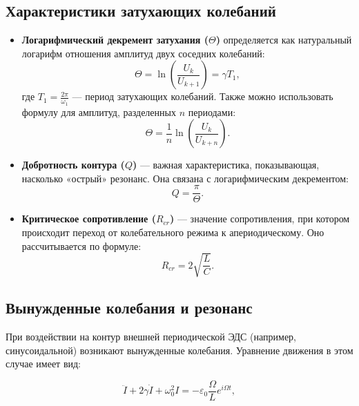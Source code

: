 \documentclass[a4paper]{article}
\begin{document}
\subsection{Характеристики затухающих колебаний}
\begin{itemize}
\item \textbf{Логарифмический декремент затухания ($\Theta$)} определяется как натуральный логарифм отношения амплитуд двух соседних колебаний:
    \begin{equation}
    \Theta = \ln\left(\frac{U_k}{U_{k+1}}\right) = \gamma T_1,
    \end{equation}
    где $T_1 = \frac{2\pi}{\omega_1}$ — период затухающих колебаний. Также можно использовать формулу для амплитуд, разделенных $n$ периодами:
    \begin{equation}
    \Theta = \frac{1}{n} \ln\left(\frac{U_k}{U_{k+n}}\right).
    \end{equation}

    \item \textbf{Добротность контура ($Q$)} — важная характеристика, показывающая, насколько «острый» резонанс. Она связана с логарифмическим декрементом:
    \begin{equation}
    Q = \frac{\pi}{\Theta}.
    \end{equation}

    \item \textbf{Критическое сопротивление ($R_{cr}$)} — значение сопротивления, при котором происходит переход от колебательного режима к апериодическому. Оно рассчитывается по формуле:
    \begin{equation}
    R_{cr} = 2\sqrt{\frac{L}{C}}.
    \end{equation}
\end{itemize}
\subsection{Вынужденные колебания и резонанс}
При воздействии на контур внешней периодической ЭДС (например, синусоидальной) возникают вынужденные колебания. Уравнение движения в этом случае имеет вид:

\begin{equation}
\ddot{I} + 2\gamma\dot{I} + \omega_0^2 I = -\varepsilon_0 \frac{\Omega}{L} e^{i\Omega t},
\end{equation}
\end{document}

